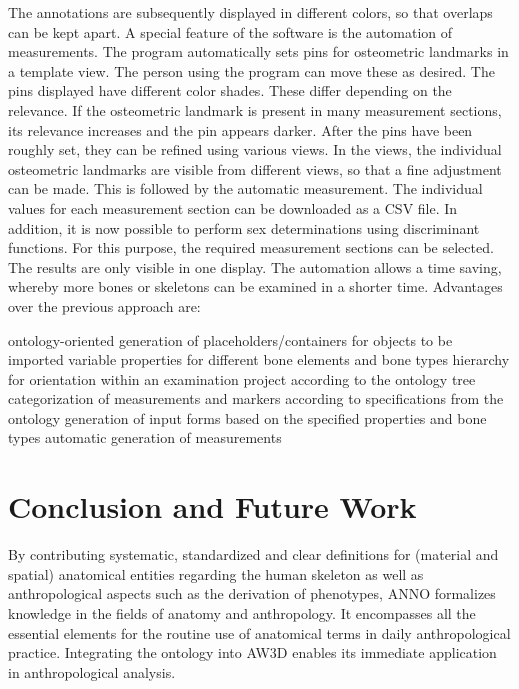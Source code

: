 \documentclass[sw]{iosart2x}
\begin{document}
The annotations are subsequently displayed in different colors, so that overlaps can be kept apart.
A special feature of the software is the automation of measurements.
The program automatically sets pins for osteometric landmarks in a template view.
The person using the program can move these as desired.
The pins displayed have different color shades.
These differ depending on the relevance.
If the osteometric landmark is present in many measurement sections, its relevance increases and the pin appears darker.
After the pins have been roughly set, they can be refined using various views.
In the views, the individual osteometric landmarks are visible from different views, so that a fine adjustment can be made.
This is followed by the automatic measurement.
The individual values for each measurement section can be downloaded as a CSV file.
In addition, it is now possible to perform sex determinations using discriminant functions.
For this purpose, the required measurement sections can be selected.
The results are only visible in one display.
The automation allows a time saving, whereby more bones or skeletons can be examined in a shorter time.
Advantages over the previous approach are:

ontology-oriented generation of placeholders/containers for objects to be imported
variable properties for different bone elements and bone types
hierarchy for orientation within an examination project according to the ontology tree
categorization of measurements and markers according to specifications from the ontology
generation of input forms based on the specified properties and bone types
automatic generation of measurements
\fi

\section{Conclusion and Future Work}

By contributing systematic, standardized and clear definitions for (material and spatial) anatomical entities regarding the human skeleton as well as anthropological aspects such as the derivation of phenotypes, ANNO formalizes knowledge in the fields of anatomy and anthropology.
It encompasses all the essential elements for the routine use of anatomical terms in daily anthropological practice.
Integrating the ontology into AW3D enables its immediate application in anthropological analysis.
\end{document}
